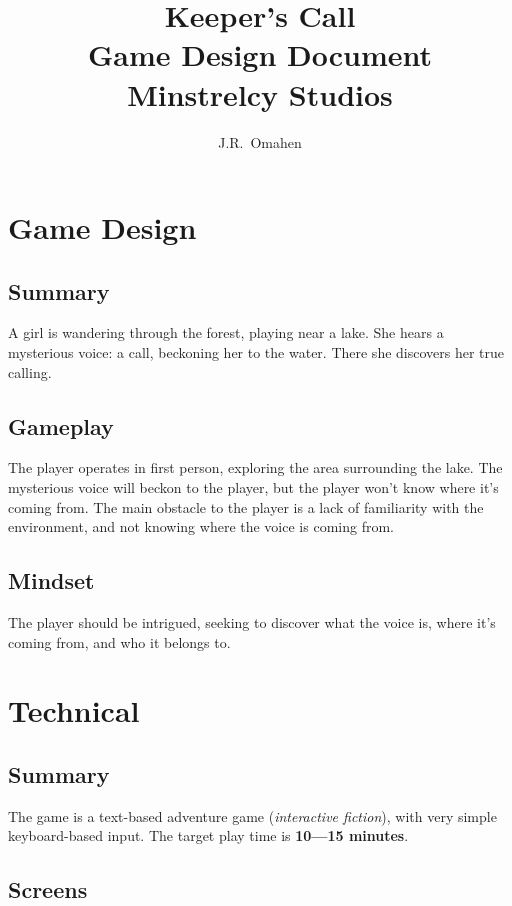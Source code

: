 \documentclass[letterpaper, twoside, 12pt]{memoir}
\title{{\HUGE Keeper's Call}\\
{\small Game Design Document}
\vspace{\fill} \\ 
Minstrelcy Studios
\vspace{\fill} \\ 
}
\author{J.R.~Omahen}
\begin{document}
\maketitle
\newpage

\tableofcontents

\chapter{Game Design}
\section{Summary}

A girl is wandering through the forest, playing near a lake. She hears a mysterious voice: a call, beckoning her to the water. There she discovers her true calling.

\section{Gameplay}

The player operates in first person, exploring the area surrounding the lake. The mysterious voice will beckon to the player, but the player won't know where it's coming from. The main obstacle to the player is a lack of familiarity with the environment, and not knowing where the voice is coming from. 

\section{Mindset}

The player should be intrigued, seeking to discover what the voice is, where it's coming from, and who it belongs to.

\chapter{Technical}
\section{Summary}

The game is a text-based adventure game (\textit{interactive fiction}), with very simple keyboard-based input. The target play time is \textbf{10---15 minutes}.

\section{Screens}
\end{document}
